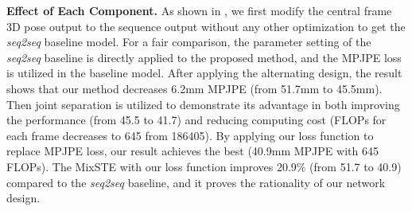 \documentclass[10pt,twocolumn,letterpaper]{article}
\begin{document}
	\textbf{Effect of Each Component.}
	\label{sec:ablation_component}
	As shown in , we first modify the central frame 3D pose output to the sequence output without any other optimization to get the \textit{seq2seq} baseline model.
	For a fair comparison, the parameter setting of the \textit{seq2seq} baseline is directly applied to the proposed method, and the MPJPE loss is utilized in the baseline model.
After applying the alternating design, the result shows that our method decreases 6.2mm MPJPE (from 51.7mm to 45.5mm).
	Then joint separation is utilized to demonstrate its advantage in both improving the performance (from 45.5 to 41.7) and reducing computing cost (FLOPs for each frame decreases to 645 from 186405). 
	By applying our loss function to replace MPJPE loss, our result achieves the best (40.9mm MPJPE with 645 FLOPs).
	The MixSTE with our loss function improves 20.9\% (from 51.7 to 40.9) compared to the \textit{seq2seq} baseline, and it proves the rationality of our network design.
\begin{table}[bp]
		\centering
		\caption{Ablation study for each component used in our method. The evaluation is performed on Human3.6M with MPJPE (mm) and FLOPs.}
		\label{tab:ablation_component}
		\vspace{-0.3cm}
	\end{table}
	
\end{document}

